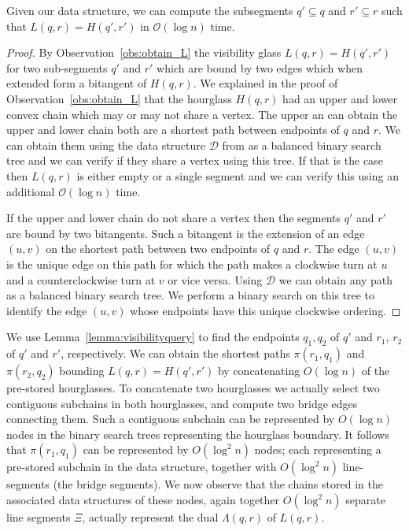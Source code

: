\documentclass[UKenglish]{lipics-v2019}
\newcommand{\mkmcal}[1]{\ensuremath{\mathcal{#1}}\xspace}
\renewcommand{\O}{\mkmcal{O}}
\newcommand{\D}{\mkmcal{D}}
\newcommand{\geod}{\pi\xspace}
\begin{document}
\begin{lemma}
  \label{lemma:visibilityquery}
  Given our data structure, we can compute the subsegments $q' \subseteq q$ and $r' \subseteq r$ such that $L(q,r) = H(q',r')$ in $\O(\log n)$ time.
\end{lemma}

\begin{proof}
    By Observation~\ref{obs:obtain_L} the visibility glass $L(q,r)=H(q',r')$ for two sub-segments $q'$ and $r'$ which are bound by two edges which when extended form a bitangent of $H(q,r)$. We explained in the proof of Observation~\ref{obs:obtain_L} that the hourglass $H(q,r)$ had an upper and lower convex chain which may or may not share a vertex. The upper an can obtain the upper and lower chain both are a shortest path between endpoints of $q$ and $r$. We can obtain them using the data structure $\D$ from \cite{guibas1989optimal} as a balanced binary search tree and we can verify if they share a vertex using this tree. If that is the case then $L(q,r)$ is either empty or a single segment and we can verify this using an additional $\mathcal{O}(\log n)$ time. 
    
    If the upper and lower chain do not share a vertex then the segments $q'$ and $r'$ are bound by two bitangents. 
    Such a bitangent is the extension of an edge $(u,v)$ on the shortest path between two endpoints of $q$ and $r$. The edge $(u,v)$ is the unique edge on this path for which the path makes a clockwise turn at $u$ and a counterclockwise turn at $v$ or vice versa. Using $\D$ we can obtain any path as a balanced binary search tree. We perform a binary search on this tree to identify the edge $(u,v)$ whose endpoints have this unique clockwise ordering.
\end{proof}

We use Lemma~\ref{lemma:visibilityquery} to find the endpoints $q_1,q_2$ of
$q'$ and $r_1$, $r_2$ of $q'$ and $r'$, respectively. We can obtain the
shortest paths $\geod(r_1,q_1)$ and $\geod(r_2,q_2)$ bounding $L(q,r)=H(q',r')$
by concatenating $O(\log n)$ of the pre-stored hourglasses. To concatenate two
hourglasses we actually select two contiguous subchains in both hourglasses,
and compute two bridge edges connecting them. Such a contiguous subchain can be
represented by $O(\log n)$ nodes in the binary search trees representing the
hourglass boundary. It follows that $\geod(r_1,q_1)$ can be represented by
$O(\log^2 n)$ nodes; each representing a pre-stored subchain in the data
structure, together with $O(\log^2 n)$ line-segments (the bridge segments). We
now observe that the chains stored in the associated data structures of these
nodes, again together $O(\log^2 n)$ separate line segments $\Xi$, actually
represent the dual $\Lambda(q,r)$ of $L(q,r)$.
\end{document}
